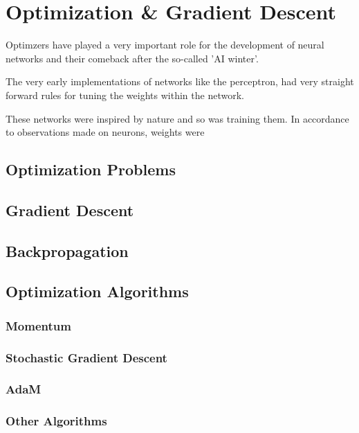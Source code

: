 \setchapterpreamble[u]{\margintoc}
\chapter{Optimization \& Gradient Descent}

Optimzers have played a very important role for the development of neural networks and their comeback after the so-called 'AI winter'.

The very early implementations of networks like the perceptron, had very straight forward rules for tuning the weights within the network.

These networks were inspired by nature and so was training them.
In accordance to observations made on neurons, weights were 

\section{Optimization Problems}

\section{Gradient Descent}

\section{Backpropagation}


\section{Optimization Algorithms}
\subsection{Momentum}
\subsection{Stochastic Gradient Descent}
\subsection{AdaM}
\subsection{Other Algorithms}

